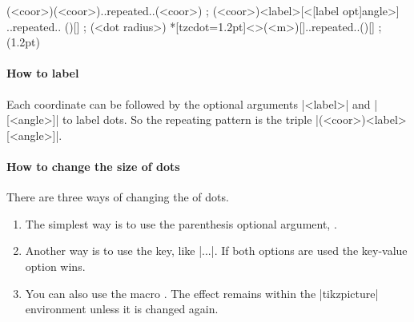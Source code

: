 \begin{tzdef}{}
\tzcdots*(<coor>)(<coor>)..repeated..(<coor>) ;
 (<coor>){<label>}[<[label opt]angle>]
                            ..repeated.. (){}[] ; (<dot radius>)
 *[tzcdot=1.2pt]<>(<m>){}[]..repeated..(){}[] ; (1.2pt)
\end{tzdef}

\begin{tzcode}{.3}
\end{tzcode}

\paragraph{How to label}

Each coordinate can be followed by the optional arguments |{<label>}| and |[<angle>]| to label dots. So the repeating pattern is the triple |(<coor>){<label>}[<angle>]|.

\begin{tzcode}{.3}
\end{tzcode}

\paragraph{How to change the size of dots}

There are three ways of changing the  of dots.
\begin{enumerate}
\item The simplest way is to use the  parenthesis optional argument, .
\item Another way is to use the  key, like |\tzcdots[tzcdot=3pt]...|.
If both options are used the key-value option wins.
\item You can also use the macro \icmd{\settzcdotradius}.
The effect remains within the |tikzpicture| environment unless it is changed again.
\end{enumerate}

